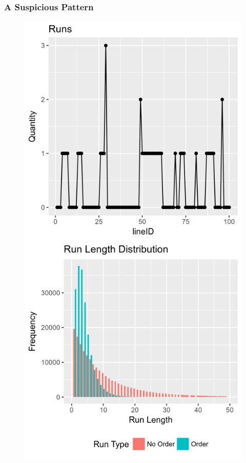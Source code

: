 \documentclass{beamer}
\begin{document}
\begin{frame}
  \frametitle{A Suspicious Pattern}

  \begin {figure}
	  \centering\includegraphics[scale=0.5]{graphics/runs.png}
    \quad
	  \centering\includegraphics[scale=0.5]{graphics/run_length.png}
	\end {figure}
\end{frame}
\end{document}
